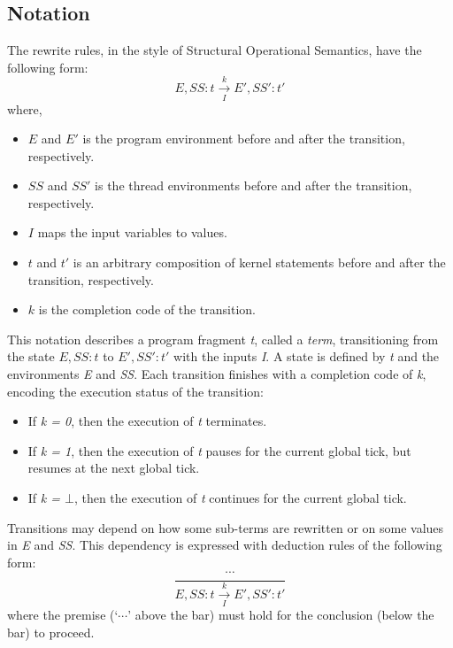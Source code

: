 
\subsection{Notation}
The rewrite rules, in the style of Structural Operational Semantics, 
have the following form:
\begin{equation*}
	E, SS: t \xrightarrow[~~I~~]{k} E', SS': t'
\end{equation*}
where,
\begin{itemize}
	\item $E$ and $E'$ is the program environment before and after the transition, respectively.
	\item $SS$ and $SS'$ is the thread environments before and after the transition, respectively.
	\item $I$ maps the input variables to values. 
	\item $t$ and $t'$ is an arbitrary composition of kernel statements before and after the transition, respectively.
	\item $k$ is the completion code of the transition.
\end{itemize}

This notation describes a program fragment \emph{t}, called a \emph{term}, transitioning from 
the state $E, SS: t$ to $E', SS': t'$ with the inputs \emph{I}. A state is defined 
by \emph{t} and the environments \emph{E} and \emph{SS}. Each transition finishes 
with a completion code of \emph{k}, encoding the execution status of the transition:

\begin{itemize}
	\item If \emph{k = 0}, then the execution of \emph{t} terminates.
	\item If \emph{k = 1}, then the execution of \emph{t} pauses for the current global tick, but 
		  resumes at the next global tick.
	\item If \emph{k = $\bot$}, then the execution of \emph{t} continues for the current global tick.
\end{itemize}

Transitions may depend on how some sub-terms are rewritten or on some values in \emph{E}
and \emph{SS}. This dependency is expressed with deduction rules of the following form:
\begin{equation*}
	\frac{
			\dotsm
		}{
			E, SS: t \xrightarrow[~~I~~]{k} E', SS': t'
		}
\end{equation*}
where the premise (`$\dotsm$' above the bar) must hold for the conclusion (below the bar) 
to proceed.

